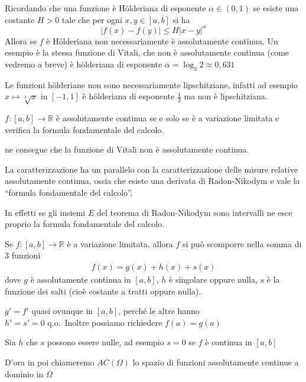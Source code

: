 Ricordando che una funzione è Hölderiana di esponente \(\alpha \in (0,1)\)
se esiste una costante \(H > 0\) tale che per ogni \(x,y \in [a,b]\) si ha
\[
|f{(x)} - f{(y)}| \le H |x-y|^{\alpha}
\]
Allora se \(f\) è Hölderiana non necessariamente è assolutamente continua. Un
esempio è la stessa funzione di Vitali, che non è assolutamente continua (come
vedremo a breve) è hölderiana di esponente \(\alpha = \log_3 2 \approx 0,631\) 
\begin{remark}
    Le funzioni hölderiane non sono necessariamente lipschitziane, infatti ad
    esempio \(x \mapsto \sqrt[3]{x}\) in \([-1, 1]\) è hölderiana di esponente
    \(\frac{1}{3}\) ma non è lipschitziana.
\end{remark}
\begin{theorem}
    \(f : [a, b] \to \mathbb{R}\) è assolutamente continua se e solo se è a
    variazione limitata e verifica la formula fondamentale del calcolo.
\end{theorem}
ne consegue che la funzione di Vitali non è assolutamente continua.
\begin{remark}
    La caratterizzazione ha un parallelo con la caratterizzazione delle misure
    relative assolutamente continua, ossia che esiste una derivata di
    Radon-Nikodym e vale la ``formula fondamentale del calcolo''.

    In effetti se gli insiemi \(E\) del teorema di Radon-Nikodym sono intervalli
    ne esce proprio la formula fondamentale del calcolo.
\end{remark}

\begin{theorem}
Se \(f: [a,b] \to \mathbb{R}\) è a variazione limitata, allora \(f\) si può
scomporre nella somma di 3 funzioni 
\begin{align*}
    f{(x)} = g{(x)} + h{(x)} + s{(x)} 
\end{align*}
dove \(g\) è assolutamente continua in \([a,b]\), \(h\) è singolare oppure
nulla, \(s\) è la funzione dei salti (cioè costante a tratti oppure nulla). 
\end{theorem}
\begin{remark}
    \(g' = f'\) quasi ovunque in \([a,b]\), perché le altre hanno \\ \(h'=s'=0\)
    q.o.~Inoltre possiamo richiedere \(f{(a)} = g{(a)}\) 
\end{remark}
\begin{note}
    Sia \(h\) che \(s\) possono essere nulle, ad esempio \(s=0\) se \(f\) è
    continua in \([a,b]\) 
\end{note}
D'ora in poi chiameremo \(AC(\Omega)\) lo spazio di funzioni assolutamente
continue a dominio in \(\Omega\) 

